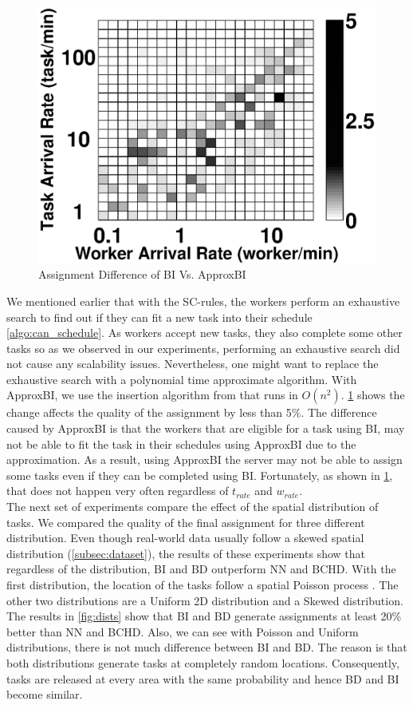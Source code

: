 \begin{figure}[h]
	\centering
	\includegraphics[width = 0.75\columnwidth]{figures/bi_abi.eps}
	\vspace{-0.1in}
	\caption{Assignment Difference of BI Vs. ApproxBI}\label{fig:bi_abi}
\end{figure}

We mentioned earlier that with the SC-rules, the workers perform an exhaustive search to find out if they can fit a new task into their schedule \cref{algo:can_schedule}. As workers accept new tasks, they also complete some other tasks so as we observed in our experiments, performing an exhaustive search did not cause any scalability issues. Nevertheless, one might want to replace the exhaustive search with a polynomial time approximate algorithm. With ApproxBI, we use the insertion algorithm from \cite{Rosenkrantz74} that runs in $O(n^2)$. \cref{fig:bi_abi} shows the change affects the quality of the assignment by less than 5\%. The difference caused by ApproxBI is that the workers that are eligible for a task using BI, may not be able to fit the task in their schedules using ApproxBI due to the approximation. As a result, using ApproxBI the server may not be able to assign some tasks even if they can be completed using BI. Fortunately, as shown in \cref{fig:bi_abi}, that does not happen very often regardless of $t_{rate}$ and $w_{rate}$.\\

The next set of experiments compare the effect of the spatial distribution of tasks. We compared the quality of the final assignment for three different distribution. Even though real-world data usually follow a skewed spatial distribution (\cref{subsec:dataset}), the results of these experiments show that regardless of the distribution, BI and BD outperform NN and BCHD. With the first distribution, the location of the tasks follow a spatial Poisson process \cite{Baddeley07}. The other two distributions are a Uniform 2D distribution and a Skewed distribution. The results in \cref{fig:dists} show that BI and BD generate assignments at least 20\% better than NN and BCHD. Also, we can see with Poisson and Uniform distributions, there is not much difference between BI and BD. The reason is that both distributions generate tasks at completely random locations. Consequently, tasks are released at every area with the same probability and hence BD and BI become similar.\\

